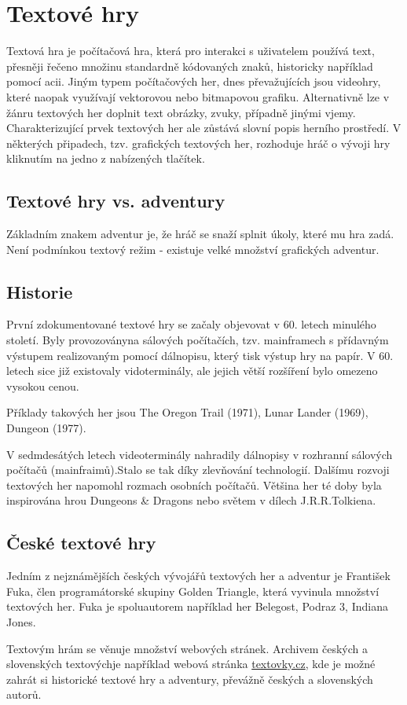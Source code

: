 \documentclass[main.tex]{subfiles}
\begin{document}
\section{Textové hry}
Textová hra je počítačová hra, která pro interakci s uživatelem používá text, přesněji řečeno množinu standardně kódovaných znaků, historicky například pomocí acii. Jiným typem počítačových her, dnes převažujících jsou videohry, které naopak využívají vektorovou nebo bitmapovou grafiku. \cite{web:wik:en:textgame} Alternativně lze v žánru textových her doplnit text obrázky, zvuky, případně jinými vjemy. Charakterizující prvek textových her ale zůstává slovní popis herního prostředí. V některých připadech, tzv. grafických textových her, rozhoduje hráč o vývoji hry kliknutím na jedno z nabízených tlačítek.\cite{web:wik:cz:textova_hra}

\subsection{Textové hry vs. adventury}
Základním znakem adventur je, že hráč se snaží splnit úkoly, které mu hra zadá. Není podmínkou textový režim - existuje velké množství grafických adventur. \cite{}

\subsection{Historie}
První zdokumentované textové hry se začaly objevovat v 60. letech minulého století. Byly provozoványna sálových počítačích, tzv. mainframech s přídavným výstupem realizovaným pomocí dálnopisu, který tisk výstup hry na papír. V 60. letech sice již existovaly vidoterminály, ale jejich větší rozšíření bylo omezeno vysokou cenou. \cite{web:pcmag:en:old_computer_games, web:wik:en:text_game}


Příklady takových her jsou The Oregon Trail (1971), Lunar Lander (1969), Dungeon (1977). \cite{web:pcmag:en:old_computer_games}

V sedmdesátých letech videoterminály nahradily dálnopisy v rozhranní sálových počítačů (mainfraimů).Stalo se tak díky zlevňování technologií. Dalšímu rozvoji textových her napomohl rozmach osobních počítačů. Většina her té doby byla inspirována hrou Dungeons \& Dragons nebo světem v dílech J.R.R.Tolkiena. \cite{web:pcgamer:en:history_of_rpgs}  


\subsection{České textové hry}
Jedním z nejznámějších českých vývojářů textových her a adventur je František Fuka, člen programátorské skupiny Golden Triangle, která vyvinula množství textových her. Fuka je spoluautorem například her Belegost, Podraz 3, Indiana Jones.

Textovým hrám se věnuje množství webových stránek. Archivem českých a slovenských textovýchje například webová stránka \href{https://www.textovky.cz}{textovky.cz}, kde je možné zahrát si historické textové hry a adventury, převážně českých a slovenských autorů. \cite{web:text:cz:archiv}
\end{document}
